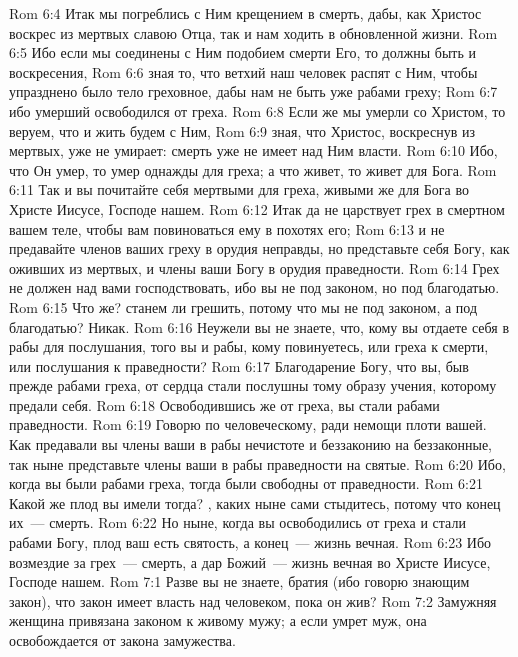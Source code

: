 \vs Rom 6:4 Итак мы погреблись с Ним крещением в смерть, дабы, как Христос воскрес из мертвых славою Отца, так и нам ходить в обновленной жизни.
\vs Rom 6:5 Ибо если мы соединены с Ним подобием смерти Его, то должны быть  и  воскресения,
\vs Rom 6:6 зная то, что ветхий наш человек распят с Ним, чтобы упразднено было тело греховное, дабы нам не быть уже рабами греху;
\vs Rom 6:7 ибо умерший освободился от греха.
\vs Rom 6:8 Если же мы умерли со Христом, то веруем, что и жить будем с Ним,
\vs Rom 6:9 зная, что Христос, воскреснув из мертвых, уже не умирает: смерть уже не имеет над Ним власти.
\vs Rom 6:10 Ибо, что Он умер, то умер однажды для греха; а что живет, то живет для Бога.
\vs Rom 6:11 Так и вы почитайте себя мертвыми для греха, живыми же для Бога во Христе Иисусе, Господе нашем.
\rsbpar\vs Rom 6:12 Итак да не царствует грех в смертном вашем теле, чтобы вам повиноваться ему в похотях его;
\vs Rom 6:13 и не предавайте членов ваших греху в орудия неправды, но представьте себя Богу, как оживших из мертвых, и члены ваши Богу в орудия праведности.
\vs Rom 6:14 Грех не должен над вами господствовать, ибо вы не под законом, но под благодатью.
\rsbpar\vs Rom 6:15 Что же? станем ли грешить, потому что мы не под законом, а под благодатью? Никак.
\vs Rom 6:16 Неужели вы не знаете, что, кому вы отдаете себя в рабы для послушания, того вы и рабы, кому повинуетесь, или  греха к смерти, или послушания к праведности?
\vs Rom 6:17 Благодарение Богу, что вы, быв прежде рабами греха, от сердца стали послушны тому образу учения, которому предали себя.
\vs Rom 6:18 Освободившись же от греха, вы стали рабами праведности.
\vs Rom 6:19 Говорю по  человеческому, ради немощи плоти вашей. Как предавали вы члены ваши в рабы нечистоте и беззаконию на  беззаконные, так ныне представьте члены ваши в рабы праведности на  святые.
\vs Rom 6:20 Ибо, когда вы были рабами греха, тогда были свободны от праведности.
\vs Rom 6:21 Какой же плод вы имели тогда? , каких ныне сами стыдитесь, потому что конец их~--- смерть.
\vs Rom 6:22 Но ныне, когда вы освободились от греха и стали рабами Богу, плод ваш есть святость, а конец~--- жизнь вечная.
\vs Rom 6:23 Ибо возмездие за грех~--- смерть, а дар Божий~--- жизнь вечная во Христе Иисусе, Господе нашем.
\vs Rom 7:1 Разве вы не знаете, братия (ибо говорю знающим закон), что закон имеет власть над человеком, пока он жив?
\vs Rom 7:2 Замужняя женщина привязана законом к живому мужу; а если умрет муж, она освобождается от закона замужества.
